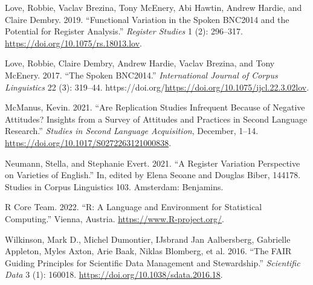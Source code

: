 \documentclass[
  letterpaper,
  DIV=11,
  numbers=noendperiod]{scrreprt}
\newlength{\cslhangindent}
\newenvironment{CSLReferences}[2] %
 {\begin{list}{}{%
  \setlength{\itemindent}{0pt}
  \setlength{\leftmargin}{0pt}
  \setlength{\parsep}{0pt}
  \ifodd #1
   \setlength{\leftmargin}{\cslhangindent}
   \setlength{\itemindent}{-1\cslhangindent}
  \fi
  \setlength{\itemsep}{#2\baselineskip}}}
 {\end{list}}
\begin{document}
\begin{CSLReferences}{1}{0}
Love, Robbie, Vaclav Brezina, Tony McEnery, Abi Hawtin, Andrew Hardie,
and Claire Dembry. 2019. {``Functional Variation in the Spoken BNC2014
and the Potential for Register Analysis.''} \emph{Register Studies} 1
(2): 296--317. \url{https://doi.org/10.1075/rs.18013.lov}.

Love, Robbie, Claire Dembry, Andrew Hardie, Vaclav Brezina, and Tony
McEnery. 2017. {``The Spoken BNC2014.''} \emph{International Journal of
Corpus Linguistics} 22 (3): 319--44.
https://doi.org/\url{https://doi.org/10.1075/ijcl.22.3.02lov}.

McManus, Kevin. 2021. {``Are Replication Studies Infrequent Because of
Negative Attitudes? Insights from a Survey of Attitudes and Practices in
Second Language Research.''} \emph{Studies in Second Language
Acquisition}, December, 1--14.
\url{https://doi.org/10.1017/S0272263121000838}.

Neumann, Stella, and Stephanie Evert. 2021. {``A Register Variation
Perspective on Varieties of English.''} In, edited by Elena Seoane and
Douglas Biber, 144178. Studies in Corpus Linguistics 103. Amsterdam:
Benjamins.

R Core Team. 2022. {``R: A Language and Environment for Statistical
Computing.''} Vienna, Austria. \url{https://www.R-project.org/}.

Wilkinson, Mark D., Michel Dumontier, IJsbrand Jan Aalbersberg,
Gabrielle Appleton, Myles Axton, Arie Baak, Niklas Blomberg, et al.
2016. {``The FAIR Guiding Principles for Scientific Data Management and
Stewardship.''} \emph{Scientific Data} 3 (1): 160018.
\url{https://doi.org/10.1038/sdata.2016.18}.

\end{CSLReferences}
\end{document}
